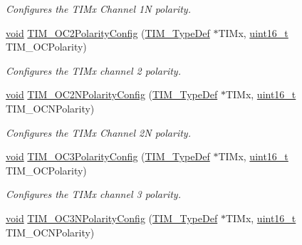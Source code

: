 \begin{DoxyCompactItemize}
\begin{DoxyCompactList}\small\item\em Configures the T\+I\+Mx Channel 1N polarity. \end{DoxyCompactList}\item 
\hyperlink{usb__devapi_8h_afabf60e7f57651d6d595a02c75f07cd0}{void} \hyperlink{group___t_i_m___exported___functions_ga6831cacaac1ef50291af94db94450797}{T\+I\+M\+\_\+\+O\+C2\+Polarity\+Config} (\hyperlink{struct_t_i_m___type_def}{T\+I\+M\+\_\+\+Type\+Def} $\ast$T\+I\+Mx, \hyperlink{_p_e___types_8h_a1f1825b69244eb3ad2c7165ddc99c956}{uint16\+\_\+t} T\+I\+M\+\_\+\+O\+C\+Polarity)
\begin{DoxyCompactList}\small\item\em Configures the T\+I\+Mx channel 2 polarity. \end{DoxyCompactList}\item 
\hyperlink{usb__devapi_8h_afabf60e7f57651d6d595a02c75f07cd0}{void} \hyperlink{group___t_i_m___exported___functions_ga2fa6ea3a89f446b52b4e699272b70cad}{T\+I\+M\+\_\+\+O\+C2\+N\+Polarity\+Config} (\hyperlink{struct_t_i_m___type_def}{T\+I\+M\+\_\+\+Type\+Def} $\ast$T\+I\+Mx, \hyperlink{_p_e___types_8h_a1f1825b69244eb3ad2c7165ddc99c956}{uint16\+\_\+t} T\+I\+M\+\_\+\+O\+C\+N\+Polarity)
\begin{DoxyCompactList}\small\item\em Configures the T\+I\+Mx Channel 2N polarity. \end{DoxyCompactList}\item 
\hyperlink{usb__devapi_8h_afabf60e7f57651d6d595a02c75f07cd0}{void} \hyperlink{group___t_i_m___exported___functions_ga1ef43b03fe666495e80aac9741ae7ab0}{T\+I\+M\+\_\+\+O\+C3\+Polarity\+Config} (\hyperlink{struct_t_i_m___type_def}{T\+I\+M\+\_\+\+Type\+Def} $\ast$T\+I\+Mx, \hyperlink{_p_e___types_8h_a1f1825b69244eb3ad2c7165ddc99c956}{uint16\+\_\+t} T\+I\+M\+\_\+\+O\+C\+Polarity)
\begin{DoxyCompactList}\small\item\em Configures the T\+I\+Mx channel 3 polarity. \end{DoxyCompactList}\item 
\hyperlink{usb__devapi_8h_afabf60e7f57651d6d595a02c75f07cd0}{void} \hyperlink{group___t_i_m___exported___functions_gac710acc5b682e892584fc6f089f61dc2}{T\+I\+M\+\_\+\+O\+C3\+N\+Polarity\+Config} (\hyperlink{struct_t_i_m___type_def}{T\+I\+M\+\_\+\+Type\+Def} $\ast$T\+I\+Mx, \hyperlink{_p_e___types_8h_a1f1825b69244eb3ad2c7165ddc99c956}{uint16\+\_\+t} T\+I\+M\+\_\+\+O\+C\+N\+Polarity)

\end{DoxyCompactItemize}
